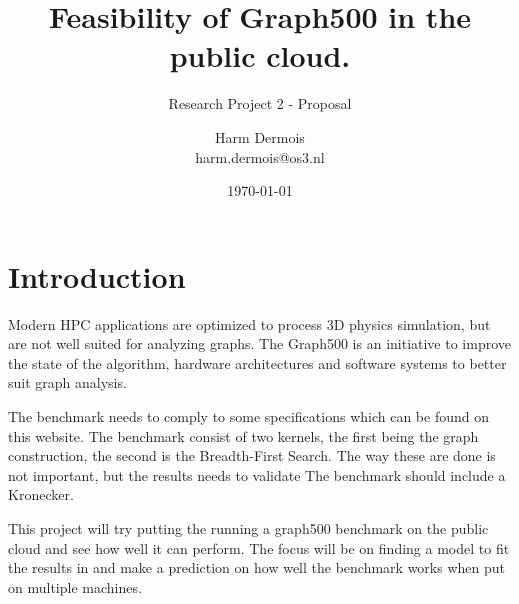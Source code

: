 \documentclass[A4]{scrartcl}
\begin{document}
\title{Feasibility of Graph500 in the public cloud.}
\subtitle{Research Project 2 - Proposal}
\date{\today}
\author{Harm Dermois \\ harm.dermois@os3.nl}

\maketitle

\section*{Introduction}
\label{sec:introduction}
Modern HPC applications are optimized to process 3D physics simulation, but are not well suited for analyzing graphs. The Graph500 \cite{murphy2010introducing} is an initiative to improve the state of the algorithm, hardware architectures and software systems to better suit graph analysis.

The benchmark needs to comply to some specifications which can be found on this website. The benchmark consist of two kernels, the first being the graph construction, the second is the Breadth-First Search. The way these are done is not important, but the results needs to validate 
The benchmark should include a Kronecker.

This project will try putting the running a graph500 benchmark on the public cloud and see how well it can perform. The focus will be on finding a model to fit the results in and make a prediction on how well the benchmark works when put on multiple machines.    



\end{document}

